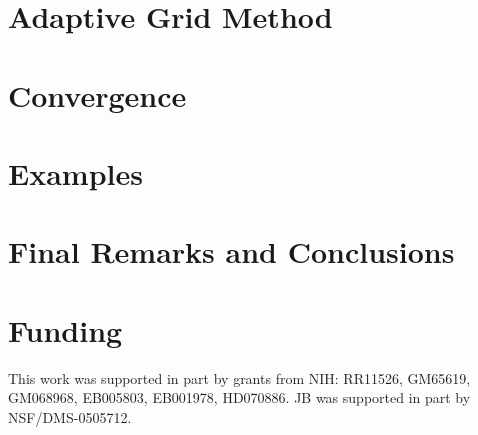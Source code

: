 \documentclass[]{interact}
\theoremstyle{plain}%
\theoremstyle{definition}
\theoremstyle{remark}
\begin{document}
\section{Adaptive Grid Method} \label{Section:Adaptive_Grid_Method}
    
\section{Convergence}
    
\section{Examples} \label{Section:Examples}
    
\section{Final Remarks and Conclusions} \label{Section:Conclusion}
    


\ifanonymous
\else
\section*{Funding}
This work was supported in part by grants from NIH:
RR11526, GM65619, GM068968, EB005803, EB001978,   HD070886.
JB was supported in part by NSF/DMS-0505712.
%
% 
\fi




\clearpage

\afterpage{\clearpage}

 


\clearpage
 \afterpage{\clearpage}

 \afterpage{\clearpage}


 
\end{document}
